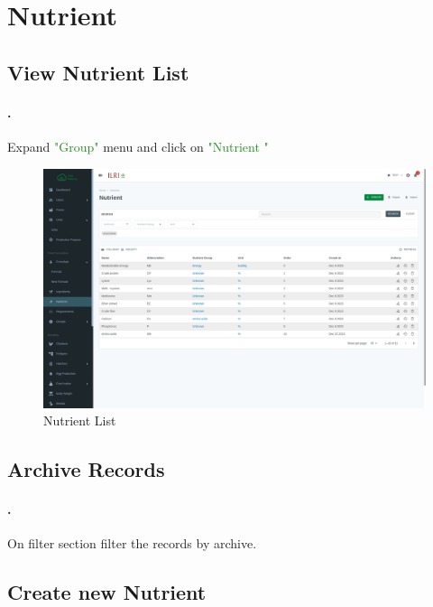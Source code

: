 \section{Nutrient}\label{sec:nutrient}

\subsection{View Nutrient  List}\label{sec:nutrient_list}
\setcounter{stepcounter}{1}
\paragraph{.}Expand \textcolor{ForestGreen}{"Group"} menu and click on \textcolor{ForestGreen}{"Nutrient "}
\begin{figure}[h!]
  	\includegraphics[width=15cm]{screenshots/nutrient_list_page.png}
  	\caption{Nutrient  List}
  	\label{fig:nutrient_list_page}
\end{figure}

\subsection{Archive Records}\label{sec:nutrient_list_archived}
\setcounter{stepcounter}{1}
\paragraph{.}On filter section filter the records by archive.

\subsection{Create new Nutrient }\label{sec:nutrient_create}
\setcounter{stepcounter}{1}
